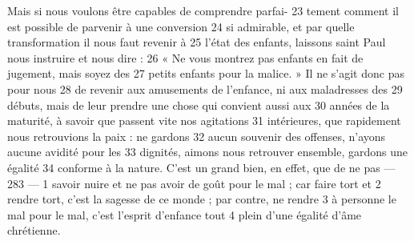 Mais si nous voulons être capables de comprendre parfai-	 
23	 	tement comment il est possible de parvenir à une conversion	 
24	 	si admirable, et par quelle transformation il nous faut revenir à	 
25	 	l'état des enfants, laissons saint Paul nous instruire et nous dire :	 
26	 	« Ne vous montrez pas enfants en fait de jugement, mais soyez des	 
27	 	petits enfants pour la malice. » Il ne s'agit donc pas pour nous	 
28	 	de revenir aux amusements de l'enfance, ni aux maladresses des	 
29	 	débuts, mais de leur prendre une chose qui convient aussi aux	 
30	 	années de la maturité, à savoir que passent vite nos agitations	 
31	 	intérieures, que rapidement nous retrouvions la paix : ne gardons	 
32	 	aucun souvenir des offenses, n'ayons aucune avidité pour les	 
33	 	dignités, aimons nous retrouver ensemble, gardons une égalité	 
34	 	conforme à la nature. C'est un grand bien, en effet, que de ne pas	 
 	--- 283 ---	 
1	 	savoir nuire et ne pas avoir de goût pour le mal ; car faire tort et	 
2	 	rendre tort, c'est la sagesse de ce monde ; par contre, ne rendre	 
3	 	à personne le mal pour le mal, c'est l'esprit d'enfance tout	 
4	 	plein d'une égalité d'âme chrétienne.